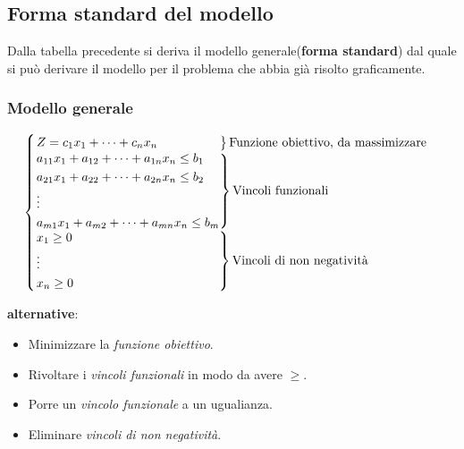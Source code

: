 \documentclass{article}
\begin{document}
    \subsection{Forma standard del modello}
      Dalla tabella precedente si deriva il modello generale(\textbf{forma standard}) dal quale si può derivare il modello per il problema che abbia già risolto graficamente.\\
      
      \subsubsection{Modello generale}
      $$
        \begin{cases}
          \begin{rcases}
            Z = c_1x_1 + \dots + c_nx_n \hspace{1.75cm}
          \end{rcases} \text{Funzione obiettivo, da massimizzare} \\
          \begin{rcases}
            a_{11}x_1 + a_{12}+\dots + a_{1n}x_n \le b_1 \\
            a_{21}x_1 + a_{22}+\dots + a_{2n}x_n \le b_2 \\
            \vdots \\
            a_{m1}x_1 + a_{m2}+\dots + a_{mn}x_n \le b_m \\
          \end{rcases} \text{Vincoli funzionali} \\ 
          \begin{rcases}
            x_1\ge0 \\
            \vdots  \\
            x_n \ge 0 \hspace{4.10cm}
          \end{rcases} \text{Vincoli di non negatività}

        \end{cases}
      $$

      \begin{tcolorbox}
        \textbf{alternative}: \\     
          \begin{itemize}
            \item Minimizzare la \textit{funzione obiettivo}.
            \item Rivoltare i \textit{vincoli funzionali} in modo da avere $\ge$.
            \item Porre un \textit{vincolo funzionale} a un ugualianza.
            \item Eliminare \textit{vincoli di non negatività}.
          \end{itemize}
      \end{tcolorbox}
    
\end{document}
